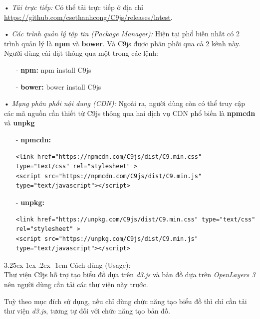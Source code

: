 \documentclass[12pt,a4paper]{article}
\makeatletter
\newcommand{\myparagraph}[1]{\paragraph{#1}\mbox{}\\} %
\renewcommand\paragraph{\@startsection{paragraph}{5}{\z@}%
  {3.25ex \@plus1ex \@minus.2ex}%
  {-1em}%
  {\normalfont\normalsize\bfseries}}
\makeatother
\begin{document}
\begin{list}{}{}
\item[•] \emph{Tải trực tiếp:} Có thể tải trực tiếp ở địa chỉ \url{https://github.com/csethanhcong/C9js/releases/latest}.

\item[•] \emph{Các trình quản lý tập tin (Package Manager):} Hiện tại phổ biến nhất có 2 trình quản lý là \textbf{npm} và \textbf{bower}. Và C9js được phân phối qua cả 2 kênh này. Người dùng cài đặt thông qua một trong các lệnh:

\begin{itemize}
\item[-] \textbf{npm:} npm install C9js
\item[-] \textbf{bower:} bower install C9js
\end{itemize}

\item[•] \emph{Mạng phân phối nội dung (CDN):} Ngoài ra, người dùng còn có thể truy cập các mã nguồn cần thiết từ C9js thông qua hai dịch vụ CDN phổ biến là \textbf{npmcdn} và \textbf{unpkg}

\begin{itemize}
\item[-] \textbf{npmcdn:} 
	\begin{lstlisting}[caption=Tải mã nguồn thông qua \textbf{npmcdn}]
<link href="https://npmcdn.com/C9js/dist/C9.min.css" type="text/css" rel="stylesheet" >
<script src="https://npmcdn.com/C9js/dist/C9.min.js" type="text/javascript"></script>
	\end{lstlisting}

\item[-] \textbf{unpkg:}
	\begin{lstlisting}[caption=Tải mã nguồn thông qua \textbf{unpkg}]
<link href="https://unpkg.com/C9js/dist/C9.min.css" type="text/css" rel="stylesheet" >
<script src="https://unpkg.com/C9js/dist/C9.min.js" type="text/javascript"></script>
	\end{lstlisting}
\end{itemize}

\end{list}

\myparagraph{Cách dùng (Usage):}
Thư viện C9js hỗ trợ tạo biểu đồ dựa trên \textit{d3.js} và bản đồ dựa trên \textit{OpenLayers 3} nên người dùng cần tải các thư viện này trước. 

Tuỳ theo mục đích sử dụng, nếu chỉ dùng chức năng tạo biểu đồ thì chỉ cần tải thư viện \textit{d3.js}, tương tự đối với chức năng tạo bản đồ.
\end{document}
